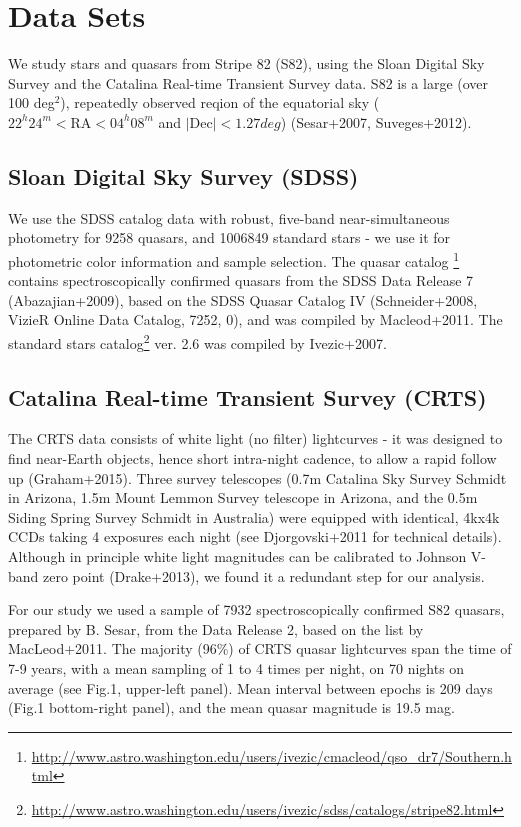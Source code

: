 \documentclass[fleqn,usenatbib]{mnras}  %
\begin{document}
\section{Data Sets}

We study stars and quasars from  Stripe 82 (S82), using the  Sloan Digital Sky Survey   and the Catalina Real-time Transient Survey data. S82 is a large (over 100 deg$^{2}$), repeatedly observed reqion of the equatorial sky ($22^{h} 24^{m} < \mathrm{RA} < 04^{h} 08^{m}$ and $\mathrm{| Dec |} < 1.27 deg$)    (Sesar+2007, Suveges+2012). 

\subsection{Sloan Digital Sky Survey (SDSS)}
We use the SDSS catalog data with  robust,  five-band near-simultaneous  photometry for  9258  quasars,  and 1006849 standard stars - we use it for photometric color information and sample selection.  The  quasar catalog \footnote{\url{http://www.astro.washington.edu/users/ivezic/cmacleod/qso_dr7/Southern.html}} contains spectroscopically confirmed quasars from the SDSS Data Release 7 (Abazajian+2009), based on the SDSS Quasar  Catalog IV (Schneider+2008, VizieR Online Data Catalog, 7252, 0), and was compiled by Macleod+2011. The standard stars catalog\footnote{\url{http://www.astro.washington.edu/users/ivezic/sdss/catalogs/stripe82.html}} ver. 2.6 was compiled by Ivezic+2007.

\subsection{Catalina Real-time Transient Survey (CRTS)}
The CRTS data consists of white light (no filter) lightcurves  - it was designed to find near-Earth objects, hence short intra-night cadence, to allow a rapid follow up (Graham+2015).  Three survey telescopes (0.7m Catalina Sky Survey Schmidt in Arizona,  1.5m Mount  Lemmon Survey telescope in Arizona, and the 0.5m Siding Spring Survey Schmidt in Australia) were equipped with identical, 4kx4k CCDs taking 4 exposures each night (see Djorgovski+2011 for technical details).
Although in principle white light magnitudes can be calibrated to Johnson V-band zero point (Drake+2013), we found it a redundant step for our analysis. 

For our study we used a sample of 7932 spectroscopically confirmed S82  quasars,   prepared by B. Sesar, from  the Data Release 2, based on the list by MacLeod+2011.  The majority (96\%) of  CRTS quasar lightcurves span the time of 7-9 years, with a mean sampling of 1 to 4 times per night,  on 70 nights on average (see Fig.1, upper-left panel).  Mean interval between epochs is 209 days (Fig.1 bottom-right panel), and the mean quasar magnitude is 19.5 mag. 
\end{document}
